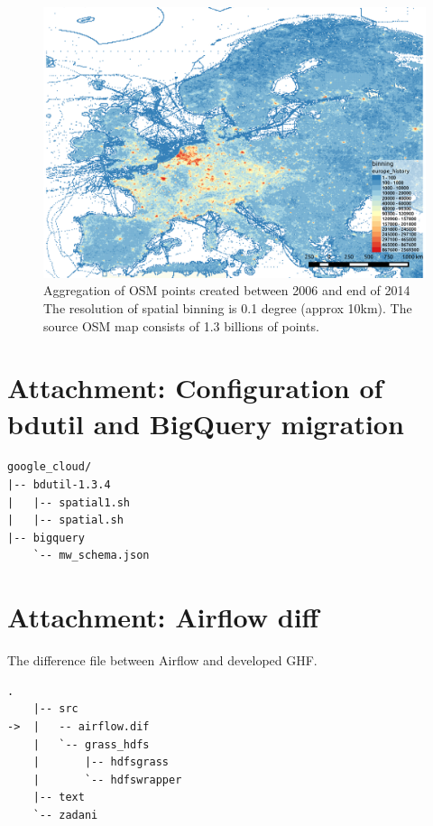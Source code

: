 \documentclass[a4paper,12pt,oneside]{report}
\begin{document}
			\begin{figure}[!htbp]
				\centering
				\includegraphics[width=1\textwidth]{./img/osm/history.png}
					\caption[Spatial binning-result]{\centering Aggregation of OSM points created between 2006 and end of 2014
						The resolution of spatial binning is 0.1 degree (approx 10km). The source OSM map consists of 1.3 billions of points.}
				\label{map_cz}
			\end{figure} 
\newpage		
	\section{Attachment: Configuration of  bdutil and BigQuery migration}\label{pythonscr}
	\begin{footnotesize}
	\begin{lstlisting}[style=mybash]
google_cloud/
|-- bdutil-1.3.4
|   |-- spatial1.sh
|   |-- spatial.sh
|-- bigquery
    `-- mw_schema.json

	\end{lstlisting}
	\end{footnotesize}
	
	
	
	\section{Attachment: Airflow diff}\label{airflow_diff}
	The difference file between Airflow and developed GHF.
\begin{footnotesize}
\begin{lstlisting}[style=mybash]
	.
	|-- src
->	|   -- airflow.dif
	|   `-- grass_hdfs
	|       |-- hdfsgrass
	|       `-- hdfswrapper
	|-- text
	`-- zadani
	
\end{lstlisting}
\end{footnotesize} 	
\newpage
\end{document}
